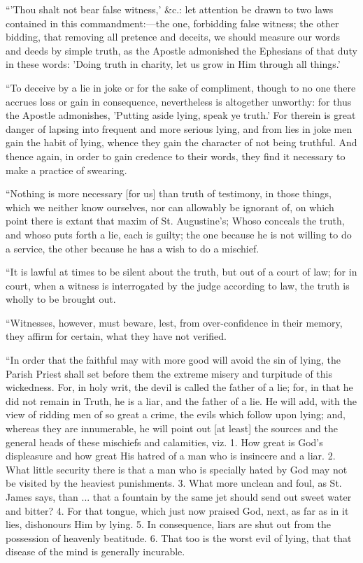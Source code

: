 ``'Thou shalt not bear false witness,' \&c.: let attention be
drawn to two laws contained in this commandment:—the one, forbidding
false witness; the other bidding, that removing all pretence and
deceits, we should measure our words and deeds by simple truth, as the
Apostle admonished the Ephesians of that duty in these words: 'Doing
truth in charity, let us grow in Him through all things.'

``To deceive by a lie in joke or for the sake of compliment,
though to no one there accrues loss or gain in consequence, nevertheless
is altogether unworthy: for thus the Apostle admonishes, 'Putting aside
lying, speak ye truth.' For therein is great danger of lapsing into
frequent and more serious lying, and from lies in joke men gain the
habit of lying, whence they gain the character of not being truthful.
And thence again, in order to gain credence to their words,
they find it necessary to make a practice of swearing.

``Nothing is more necessary [for us] than truth of
testimony, in those things, which we neither know ourselves, nor can
allowably be ignorant of, on which point there is extant that maxim of
St. Augustine's; Whoso conceals the truth, and whoso puts forth a
lie, each is guilty; the one because he is not willing to do a service,
the other because he has a wish to do a mischief.

``It is lawful at times to be silent about the truth, but out of
a court of law; for in court, when a witness is interrogated by the
judge according to law, the truth is wholly to be brought out.

``Witnesses, however, must beware, lest, from over-confidence
in
their memory, they affirm for certain, what they have not verified.

``In order that the faithful may with more good will avoid the
sin of lying, the Parish Priest shall set before them the extreme misery
and turpitude of this wickedness. For, in holy writ, the devil is called
the father of a lie; for, in that he did not remain in Truth, he is a
liar, and the father of a lie. He will add, with the view of ridding men
of so great a crime, the evils which follow upon lying; and, whereas they
are innumerable, he will point out [at least] the sources and
the general heads of these mischiefs and calamities, viz. 1. How great
is God's displeasure and how great His hatred of a man who is insincere
and a liar. 2. What little security there is that a man who is
specially hated by God may not be visited by the heaviest punishments.
3. What more unclean and foul, as St. James says, than ... that a
fountain by the same jet should send out sweet water and bitter? 4. For
that tongue, which just now praised God, next, as far as in it lies,
dishonours Him by lying. 5. In consequence, liars are shut out from the
possession of heavenly beatitude. 6. That too is the worst evil of
lying, that that disease of the mind is generally incurable.

